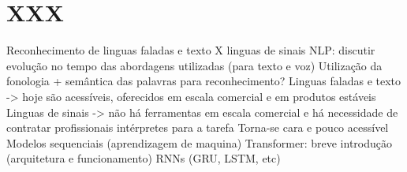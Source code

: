 \section{XXX}
\label{xxx}

Reconhecimento de linguas faladas e texto X linguas de sinais
NLP: discutir evolução no tempo das abordagens utilizadas (para texto e voz) 
Utilização da fonologia + semântica das palavras para reconhecimento?
Linguas faladas e texto -> hoje são acessíveis, oferecidos em escala comercial e em produtos estáveis
Linguas de sinais -> não há ferramentas em escala comercial e há necessidade de contratar profissionais intérpretes para a tarefa
Torna-se cara e pouco acessível
Modelos sequenciais (aprendizagem de maquina)
Transformer: breve introdução (arquitetura e funcionamento)
RNNs (GRU, LSTM, etc)
